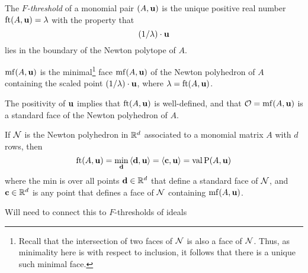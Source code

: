 \documentclass[11pt]{amsart}
\begin{document}
\begin{definition}
The \emph{$F$-threshold} of a monomial pair $(A, \mathbf{u})$ is the unique positive real number $\operatorname{ft}(A, \mathbf{u}) = \lambda$ with the property that  \[ (1/\lambda)  \cdot \mathbf{u}  \] 
lies in the boundary of the Newton polytope of $A$.  
\end{definition}

\begin{definition}
$\operatorname{mf}(A, \mathbf{u})$ is the minimal\footnote{Recall that the intersection of two faces of $\mathcal{N}$ is also a face of $\mathcal{N}$. Thus, as minimality here is with respect to inclusion, it follows that there is a unique such minimal face.} face $\operatorname{mf}(A, \mathbf{u})$ of the Newton polyhedron of $A$ containing the scaled point $(1/\lambda) \cdot \mathbf{u}$, where $\lambda = \operatorname{ft}(A, \mathbf{u})$.
\end{definition}


\begin{remark}  The positivity of $\mathbf{u}$ implies that $\operatorname{ft}(A, \mathbf{u})$ is well-defined, and that $\mathcal{O} = \operatorname{mf}(A, \mathbf{u})$ is a standard face of the Newton polyhedron of $A$.
\end{remark}

\begin{proposition}
\label{FT descriptions: P}
  If $\mathcal{N}$ is the Newton polyhedron in $\mathbb{R}^d$ associated to a monomial matrix $A$ with $d$ rows, then
\[ \operatorname{ft}(A, \mathbf{u}) = \min_{\mathbf{d}} \, \langle \mathbf{d}, \mathbf{u} \rangle = \langle \mathbf{c}, \mathbf{u} \rangle = \operatorname{val} \mathrm{P}(A, \mathbf{u}) \] where the min is over all points $\mathbf{d} \in \mathbb{R}^d$ that define a standard face of $\mathcal{N}$, and $\mathbf{c} \in \mathbb{R}^d$ is any point that defines a face of $\mathcal{N}$ containing $\operatorname{mf}(A, \mathbf{u})$. 
\end{proposition}

\alert[inline]{Will need to connect this to $F$-thresholds of ideals}
\end{document}
